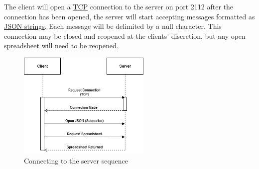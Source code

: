 The client will open a \href{https://en.wikipedia.org/wiki/Transmission_Control_Protocol}{TCP} 
connection to the server on port 2112 after the connection has been opened, 
the server will start accepting messages formatted as \href{https://en.wikipedia.org/wiki/JSON}{JSON strings}. 
Each message will be delimited by a null character.
This connection may be closed and reopened at the clients’ discretion, but any open spreadsheet will need to be reopened.

\begin{figure}[H]
    \begin{center}
        \includegraphics[width=2.5in]{Figures/connect.png}
        \caption{Connecting to the server sequence}
    \end{center}
\end{figure}